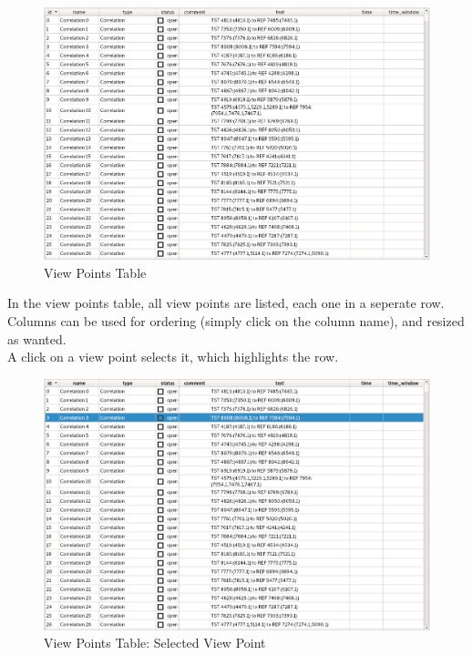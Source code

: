 \begin{figure}[H]
    \hspace*{-2cm}
    \includegraphics[width=18cm,frame]{figures/view_points_table.png}
  \caption{View Points Table}
\end{figure}

In the view points table, all view points are listed, each one in a seperate row. Columns can be used for ordering (simply click on the column name), and resized as wanted. \\

A click on a view point selects it, which highlights the row.

\begin{figure}[H]
    \hspace*{-2cm}
    \includegraphics[width=18cm,frame]{figures/view_points_table_selected.png}
  \caption{View Points Table: Selected View Point}
\end{figure}

